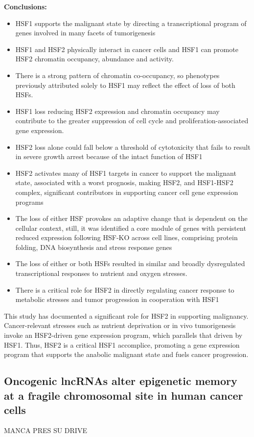 \textbf{Conclusions:}
\begin{itemize}
\tightlist
\item HSF1 supports the malignant state by directing a transcriptional program of genes involved in many facets of tumorigenesis
\item HSF1 and HSF2 physically interact in cancer cells and HSF1 can promote HSF2 chromatin occupancy, abundance
and activity.
\item There is a strong pattern of chromatin co-occupancy, so phenotypes previously attributed solely to HSF1 may
reflect the effect of loss of both HSFs.
\item HSF1 loss reducing HSF2 expression and chromatin occupancy may contribute to the greater suppression of cell
cycle and proliferation-associated gene expression.
\item HSF2 loss alone could fall below a threshold of cytotoxicity that fails to result in severe growth arrest because of the
intact function of HSF1
\item HSF2 activates many of HSF1 targets in cancer to support the malignant state, associated with a worst prognosis, making HSF2, and HSF1-HSF2 complex, significant contributors in supporting cancer cell gene expression programs
\item The loss of either HSF provokes an adaptive change that is dependent on the cellular context, still, it was identified a core module of genes
with persistent reduced expression following HSF-KO across cell lines, comprising protein folding, DNA biosynthesis and stress response genes
\item The loss of either or both HSFs resulted in similar and broadly dysregulated transcriptional
responses to nutrient and oxygen stresses.
\item There is a critical role for HSF2 in directly regulating cancer response to metabolic stresses and tumor progression in cooperation with HSF1
\end{itemize}

This study has documented a significant role for HSF2 in supporting malignancy. Cancer-relevant stresses such as nutrient
deprivation or in vivo tumorigenesis invoke an HSF2-driven gene expression program, which parallels that driven by HSF1.
Thus, HSF2 is a critical HSF1 accomplice, promoting a gene expression program that supports the anabolic malignant state
and fuels cancer progression.

\subsection{Oncogenic lncRNAs alter epigenetic memory at a fragile chromosomal site in human cancer cells}
MANCA PRES SU DRIVE

